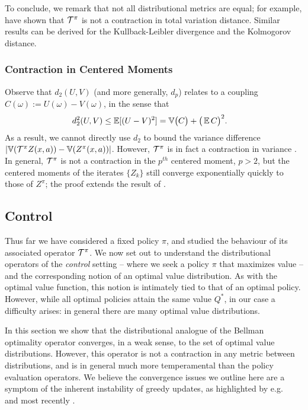 \documentclass{article}
\def \cTpi {\cT^\pi}
\begin{document}
%
To conclude, we remark that not all
distributional metrics are equal; for example, \citet{chung87discounted} have shown that $\cTpi$ is not a contraction in total variation distance. Similar results can be derived for the Kullback-Leibler divergence and the Kolmogorov distance.

%

\subsubsection{Contraction in Centered Moments}
Observe that $d_2(U, V)$ (and more generally, $d_p$) relates to a coupling $C(\omega) := U(\omega) - V(\omega)$, in the sense that
\begin{align*}
d_2^2(U, V) &\le \expect [ (U - V)^2 ] = \Var \big (C \big ) + \big ( \expect C \big )^2 .
\end{align*}
As a result, we cannot directly use $d_2$ to bound the variance difference $| \Var(\cTpi Z(x,a)) - \Var(Z^\pi(x,a)) |$. However, $\cTpi$ is in fact a contraction in variance \citep[][see also appendix]{sobel82variance}.
In general, $\cTpi$ is not a contraction in the $p^{th}$ centered moment, $p > 2$, but the centered moments of the iterates $\{ Z_k \}$ still converge exponentially quickly to those of $Z^\pi$; the proof extends the result of \citet{rosler92fixed}.
%
%
%
%
%
%
%
%

\subsection{Control}\label{sec:control}

Thus far we have considered a fixed policy $\pi$, and studied the behaviour of its associated operator $\cTpi$. We now set out to understand the distributional operators of the \emph{control} setting -- where we seek a policy $\pi$ that maximizes value -- and the corresponding notion of an optimal value distribution. As with the optimal value function, this notion is intimately tied to that of an optimal policy. However, while all optimal policies attain the same value $Q^*$, in our case a difficulty arises: in general there are many optimal value distributions.

In this section we show that the distributional analogue of the Bellman optimality operator converges, in a weak sense, to the set of optimal value distributions. However, this operator is not a contraction in any metric between distributions, and is in general much more temperamental than the policy evaluation operators. We believe the convergence issues we outline here are a symptom of the inherent instability of greedy updates, as highlighted by e.g.~\citet{tsitsiklis02convergence} and most recently \citet{harutyunyan16qlambda}.
%
\end{document}
